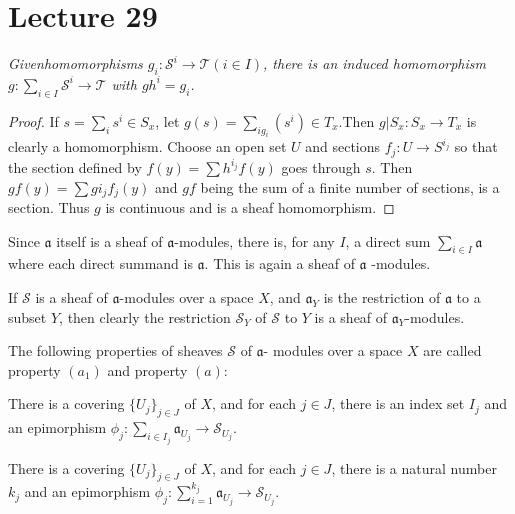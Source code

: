 \chapter{Lecture 29}\label{chap29:lec29}

\textit{Given\pageoriginale homomorphisms $g_i : \mathscr{S}^i \to
  \mathscr{T}(i \in I)$, there is an induced homomorphism $g : \sum
  \limits_{i \in  I} \mathscr{S}^i \to \mathscr{T}$ with $g
  h^i=g_i$.}  

\begin{proof}
If $s= \sum_i s^i \in S_x$, let $g(s)= \sum_{ig_i}(s^i) \in T_x$.Then
$g|S_x : S_x \to T_x$ is clearly a homomorphism. Choose an open set
$U$ and sections $f_j : U \to S^{i_j} $ so that the section defined by
$f(y) = \sum h^{i_j}f(y)$ goes through $s$. Then $gf(y)= \sum gi_j f_j
(y)$ and $gf$ being the sum of a finite number of sections, is a
section. Thus $g$ is continuous and is a sheaf homomorphism.  
\end{proof}

\begin{note*}
 Since $\mathfrak{a}$ itself is a sheaf of $\mathfrak{a}$-modules,
 there is, for any $I$, a direct sum $\sum \limits_{i \in I}
 \mathfrak{a}$ where each direct  summand is $\mathfrak{a}$. This is again a
 sheaf of $\mathfrak{a}$ -modules.    
 \end{note*}
 
If $\mathscr{S}$ is a sheaf of $\mathfrak{a}$-modules over a space
$X$, and $\mathfrak{a}_Y$ is the restriction of $\mathfrak{a}$ to a
subset $Y$, then clearly the restriction $\mathscr{S}_Y$ of
$\mathscr{S}$ to $Y$ is a sheaf of $\mathfrak{a}_Y$-modules.  

\begin{defi*}
The following properties of sheaves $\mathscr{S}$ of $\mathfrak{a}$-
modules over a space $X$ are called property $(a_1)$ and property $(a):$  
\end{defi*}

\medskip
{}%
 \; There is a covering $\{U_j \}_{j \in J}$ of $X$, and for each $j \in
J$, there is an index set $I_j$ and an epimorphism $\phi_j :
\sum\limits_{i \in I_j} \mathfrak{a}_{U_j} \to \mathscr{S}_{U_j}$.  

\medskip
{}%
\; There is a covering $\{U_j \}_{j \in J}$ of $X$, and for each $j \in
J$, there is a natural number $k_j$ and an epimorphism $\phi_j :
\sum^{k_j}_{i=1} \mathfrak{a}_{U_j} \to \mathscr{S}_{U_j}$.\pageoriginale

